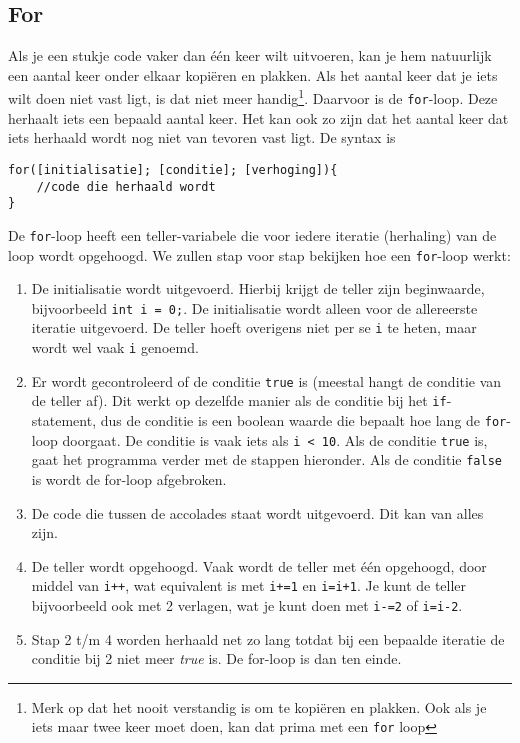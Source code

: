 \documentclass[12pt,a4paper]{article}
\newcommand{\icode}{\lstinline}
\begin{document}
\subsection{For}
Als je een stukje code vaker dan \'e\'en keer wilt uitvoeren, kan je hem natuurlijk een aantal keer onder elkaar kopi\"eren en plakken. Als het aantal keer dat je iets wilt doen niet vast ligt, is dat niet meer handig\footnote{Merk op dat het nooit verstandig is om te kopi\"eren en plakken. Ook als je iets maar twee keer moet doen, kan dat prima met een \icode{for} loop}. Daarvoor is de \icode{for}-loop.
Deze herhaalt iets een bepaald aantal keer. Het kan ook zo zijn dat het aantal keer dat iets herhaald wordt nog niet van tevoren vast ligt. De syntax is 
\begin{lstlisting}
for([initialisatie]; [conditie]; [verhoging]){
	//code die herhaald wordt
}
\end{lstlisting}
De \icode{for}-loop heeft een teller-variabele die voor iedere iteratie (herhaling) van de loop wordt opgehoogd. We zullen stap voor stap bekijken hoe een \icode{for}-loop werkt:

\begin{enumerate}
	\item De initialisatie wordt uitgevoerd. Hierbij krijgt de teller zijn beginwaarde, bijvoorbeeld \icode{int i = 0;}. De initialisatie wordt alleen voor de allereerste iteratie uitgevoerd. De teller hoeft overigens niet per se \icode{i} te heten, maar wordt wel vaak \icode{i} genoemd. 
	\item Er wordt gecontroleerd of de conditie \icode{true} is (meestal hangt de conditie van de teller af). Dit werkt op dezelfde manier als de conditie bij het \icode{if}-statement, dus de conditie is een boolean waarde die bepaalt hoe lang de \icode{for}-loop doorgaat. De conditie is vaak iets als \icode{i < 10}. Als de conditie \icode{true} is, gaat het programma verder met de stappen hieronder. Als de conditie \icode{false} is wordt de for-loop afgebroken. 
	\item De code die tussen de accolades staat wordt uitgevoerd. Dit kan van alles zijn. 
	\item De teller wordt opgehoogd. Vaak wordt de teller met \'e\'en opgehoogd, door middel van \icode{i++}, wat equivalent is met \icode{i+=1} en \icode{i=i+1}. Je kunt de teller bijvoorbeeld ook met 2 verlagen, wat je kunt doen met \icode{i-=2} of \icode{i=i-2}.
	\item Stap 2 t/m 4 worden herhaald net zo lang totdat bij een bepaalde iteratie de conditie bij 2 niet meer \emph{true} is. De for-loop is dan ten einde. 
\end{enumerate}
\end{document}
